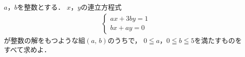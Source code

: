 \documentclass[../../main.tex]{subfiles}
\begin{document}
$a$，$b$を整数とする．
$x$，$y$の連立方程式
\begin{align}
  \begin{cases} ax+3by=1 \\ bx+ay=0
  \end{cases}
\end{align}
が整数の解をもつような組$(a, \, b)$のうちで，
$0 \leqq a$，$0 \leqq b \leqq 5$を満たすものをすべて求めよ．
\end{document}
